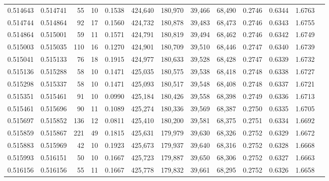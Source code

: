 \begin{tabular}{rrrrrrrrrrrrr}
0.514643 & 0.514741 &    55 &  10 &                                     0.1538 & 424,640 & 180,970 &  39,466 &  68,490 & 0.2746 & 0.6344 & 1.6763 \\
0.514744 & 0.514864 &    92 &  17 &                                     0.1560 & 424,732 & 180,878 &  39,483 &  68,473 & 0.2746 & 0.6343 & 1.6755 \\
0.514864 & 0.515001 &    59 &  11 &                                     0.1571 & 424,791 & 180,819 &  39,494 &  68,462 & 0.2746 & 0.6342 & 1.6749 \\
0.515003 & 0.515035 &   110 &  16 &                                     0.1270 & 424,901 & 180,709 &  39,510 &  68,446 & 0.2747 & 0.6340 & 1.6739 \\
0.515041 & 0.515133 &    76 &  18 &                                     0.1915 & 424,977 & 180,633 &  39,528 &  68,428 & 0.2747 & 0.6339 & 1.6732 \\
0.515136 & 0.515288 &    58 &  10 &                                     0.1471 & 425,035 & 180,575 &  39,538 &  68,418 & 0.2748 & 0.6338 & 1.6727 \\
0.515298 & 0.515337 &    58 &  10 &                                     0.1471 & 425,093 & 180,517 &  39,548 &  68,408 & 0.2748 & 0.6337 & 1.6721 \\
0.515351 & 0.515461 &    91 &  10 &                                     0.0990 & 425,184 & 180,426 &  39,558 &  68,398 & 0.2749 & 0.6336 & 1.6713 \\
0.515461 & 0.515696 &    90 &  11 &                                     0.1089 & 425,274 & 180,336 &  39,569 &  68,387 & 0.2750 & 0.6335 & 1.6705 \\
0.515697 & 0.515852 &   136 &  12 &                                     0.0811 & 425,410 & 180,200 &  39,581 &  68,375 & 0.2751 & 0.6334 & 1.6692 \\
0.515859 & 0.515867 &   221 &  49 &                                     0.1815 & 425,631 & 179,979 &  39,630 &  68,326 & 0.2752 & 0.6329 & 1.6672 \\
0.515883 & 0.515969 &    42 &  10 &                                     0.1923 & 425,673 & 179,937 &  39,640 &  68,316 & 0.2752 & 0.6328 & 1.6668 \\
0.515993 & 0.516151 &    50 &  10 &                                     0.1667 & 425,723 & 179,887 &  39,650 &  68,306 & 0.2752 & 0.6327 & 1.6663 \\
0.516156 & 0.516156 &    55 &  11 &                                     0.1667 & 425,778 & 179,832 &  39,661 &  68,295 & 0.2752 & 0.6326 & 1.6658 \\

\end{tabular}
